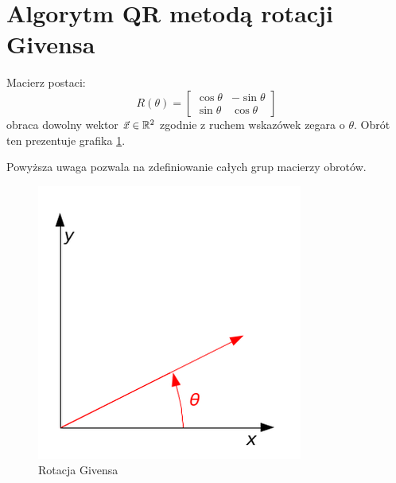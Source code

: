 \documentclass[12pt,a4paper]{report}
\begin{document}
\section{Algorytm QR metodą rotacji Givensa}
\begin{remark}
Macierz postaci: 
$$
R(\theta) = \begin{bmatrix}
\cos\theta & -\sin\theta \\
\sin\theta & \cos\theta
\end{bmatrix}
$$
obraca dowolny wektor $\vec{x}\in \mathbb{R}^{2}$ zgodnie z ruchem wskazówek zegara o $\theta$. Obrót ten prezentuje grafika \ref{rys:logo:jeden}.
\end{remark}

Powyższa uwaga pozwala na zdefiniowanie całych grup macierzy obrotów.
\begin{figure}
\centering
\includegraphics[width=\linewidth]{rys/givens_rot.png}
\caption{Rotacja Givensa \citep{ilustracja}}\label{rys:logo:jeden}
\end{figure}
\end{document}
